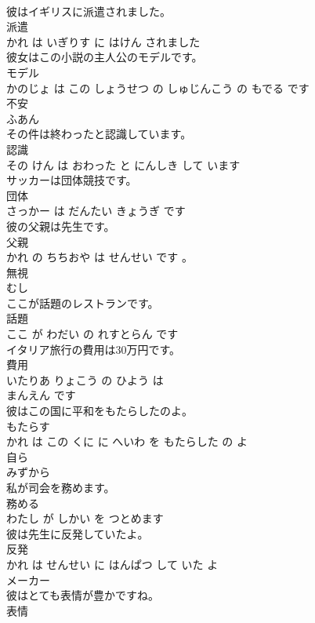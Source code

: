 \documentclass[8pt]{extreport}
\begin{document}
\begin{CJK}{UTF8}{min}
\\	彼はイギリスに派遣されました。	
\\	派遣 
\\	かれ は いぎりす に はけん されました			
\\	彼女はこの小説の主人公のモデルです。	
\\	モデル 
\\	かのじょ は この しょうせつ の しゅじんこう の もでる です			
\\	不安	
\\	ふあん			
\\	その件は終わったと認識しています。	
\\	認識 
\\	その けん は おわった と にんしき して います			
\\	サッカーは団体競技です。	
\\	団体 
\\	さっかー は だんたい きょうぎ です			
\\	彼の父親は先生です。	
\\	父親 
\\	かれ の ちちおや は せんせい です 。			
\\	無視	
\\	むし			
\\	ここが話題のレストランです。	
\\	話題 
\\	ここ が わだい の れすとらん です			
\\	イタリア旅行の費用は30万円です。	
\\	費用 
\\	いたりあ りょこう の ひよう は 
\\	まんえん です			
\\	彼はこの国に平和をもたらしたのよ。	
\\	もたらす 
\\	かれ は この くに に へいわ を もたらした の よ			
\\	自ら	
\\	みずから			
\\	私が司会を務めます。	
\\	務める 
\\	わたし が しかい を つとめます			
\\	彼は先生に反発していたよ。	
\\	反発 
\\	かれ は せんせい に はんぱつ して いた よ			
\\	メーカー	
\\	彼はとても表情が豊かですね。	
\\	表情 

\end{CJK}
\end{document}
